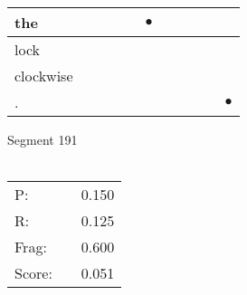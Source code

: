 \documentclass[landscape]{article}
\newcommand{\ssp}{\hspace{2pt}}
\newcommand{\mex}{\cellcolor{g}$\bullet$}
\begin{document}
\begin{tabular}{|l|p{10pt}|p{10pt}|p{10pt}|p{10pt}|p{10pt}|p{10pt}|p{10pt}|p{10pt}|p{10pt}|p{10pt}|}
\hline
\ssp \cellcolor{ref4}the \ssp&\hspace{2pt}&\hspace{2pt}&\hspace{2pt}&\hspace{2pt}&\hspace{2pt}\mex&\hspace{2pt}&\hspace{2pt}&\hspace{2pt}&\hspace{2pt}&\hspace{2pt}\\
\hline
\ssp lock \ssp&\hspace{2pt}&\hspace{2pt}&\hspace{2pt}&\hspace{2pt}&\hspace{2pt}&\hspace{2pt}&\hspace{2pt}&\hspace{2pt}&\hspace{2pt}&\hspace{2pt}\\
\hline
\ssp clockwise \ssp&\hspace{2pt}&\hspace{2pt}&\hspace{2pt}&\hspace{2pt}&\hspace{2pt}&\hspace{2pt}&\hspace{2pt}&\hspace{2pt}&\hspace{2pt}&\hspace{2pt}\\
\hline
\ssp \cellcolor{ref9}. \ssp&\hspace{2pt}&\hspace{2pt}&\hspace{2pt}&\hspace{2pt}&\hspace{2pt}&\hspace{2pt}&\hspace{2pt}&\hspace{2pt}&\hspace{2pt}&\hspace{2pt}\mex\\
\hline
\end{tabular}

\vspace{6pt}
\noindent Segment 191\\\\
\noindent\begin{tabular}{lm{12pt}r}
\hline
P:&&0.150\\
R:&&0.125\\
Frag:&&0.600\\
Score:&&0.051\\
\end{tabular}
\end{document}
